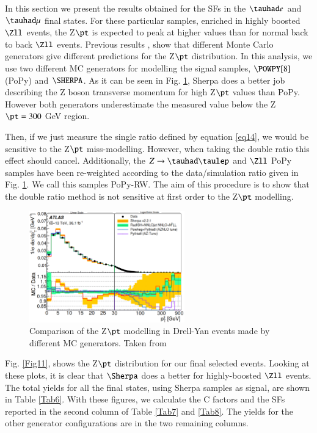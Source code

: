 In this section we present the results obtained for the SFs in the $\tauhad e$ and $\tauhad \mu$ final states. For these particular samples, enriched in highly boosted $\Zll$ events, the Z$\pt$ is expected to peak at higher values than for normal back to back $\Zll$ events. Previous results \cite{Aad:2019wmn}, show that different Monte Carlo generators give different predictions for the Z$\pt$ distribution. In this analysis, we use two different MC generators for modelling the signal samples, $\POWPY[8]$ (PoPy) and $\SHERPA$. As it can be seen in Fig. \ref{Fig10}, Sherpa does a better job describing the Z boson transverse momentum for high Z$\pt$ values than PoPy. However both generators underestimate the measured value below the Z$\pt=300$ GeV region. 

Then, if we just measure the single ratio defined by equation \ref{eq14}, we would be sensitive to the Z$\pt$ miss-modelling. However, when taking the double ratio this effect should cancel. Additionally, the $Z\to\tauhad\taulep$ and $\Zll$ PoPy samples have been re-weighted according to the data/simulation ratio given in Fig. \ref{Fig10}. We call this samples PoPy-RW. The aim of this procedure is to show that the double ratio method is not sensitive at first order to the Z$\pt$ modelling.

\begin{figure}[htbp]
	\centering
	\includegraphics[width=0.6\textwidth]{figures/Fig10}
	\caption{Comparison of the Z$\pt$ modelling in Drell-Yan events made by different MC generators. Taken from \cite{Aad:2019wmn}}
	\label{Fig10}
\end{figure}

Fig. \ref{Fig11}, shows the Z$\pt$ distribution for our final selected events. Looking at these plots, it is clear that $\Sherpa$ does a better for highly-boosted $\Zll$ events. The total yields for all the final states, using Sherpa samples as signal, are shown in Table \ref{Tab6}. With these figures, we calculate the C factors and the SFs reported in the second column of Table \ref{Tab7} and \ref{Tab8}. The yields for the other generator configurations are in the two remaining columns.

